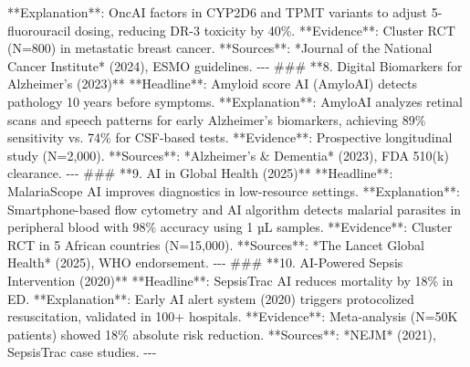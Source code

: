 \documentclass{article}%
\begin{document}
%
**Explanation**: OncAI factors in CYP2D6 and TPMT variants to adjust 5{-}fluorouracil dosing, reducing DR{-}3 toxicity by 40\%.\newline%
%
**Evidence**: Cluster RCT (N=800) in metastatic breast cancer.\newline%
%
**Sources**: *Journal of the National Cancer Institute* (2024), ESMO guidelines.\newline%
%
{-}{-}{-}\newline%
%
\#\#\# **8. Digital Biomarkers for Alzheimer’s (2023)**\newline%
%
**Headline**: Amyloid score AI (AmyloAI) detects pathology 10 years before symptoms.\newline%
%
**Explanation**: AmyloAI analyzes retinal scans and speech patterns for early Alzheimer’s biomarkers, achieving 89\% sensitivity vs. 74\% for CSF{-}based tests.\newline%
%
**Evidence**: Prospective longitudinal study (N=2,000).\newline%
%
**Sources**: *Alzheimer’s \& Dementia* (2023), FDA 510(k) clearance.\newline%
%
{-}{-}{-}\newline%
%
\#\#\# **9. AI in Global Health (2025)**\newline%
%
**Headline**: MalariaScope AI improves diagnostics in low{-}resource settings.\newline%
%
**Explanation**: Smartphone{-}based flow cytometry and AI algorithm detects malarial parasites in peripheral blood with 98\% accuracy using 1 µL samples.\newline%
%
**Evidence**: Cluster RCT in 5 African countries (N=15,000).\newline%
%
**Sources**: *The Lancet Global Health* (2025), WHO endorsement.\newline%
%
{-}{-}{-}\newline%
%
\#\#\# **10. AI{-}Powered Sepsis Intervention (2020)**\newline%
%
**Headline**: SepsisTrac AI reduces mortality by 18\% in ED.\newline%
%
**Explanation**: Early AI alert system (2020) triggers protocolized resuscitation, validated in 100+ hospitals.\newline%
%
**Evidence**: Meta{-}analysis (N=50K patients) showed 18\% absolute risk reduction.\newline%
%
**Sources**: *NEJM* (2021), SepsisTrac case studies.\newline%
%
{-}{-}{-}\newline%
\end{document}
